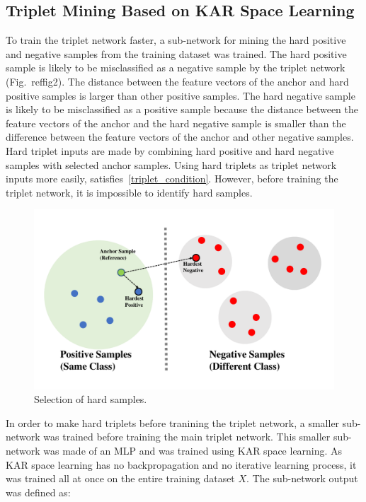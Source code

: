 \subsection{Triplet Mining Based on KAR Space Learning}
To train the triplet network faster, a sub-network for mining the hard positive and negative samples from the training dataset was trained.
The hard positive sample is likely to be misclassified as a negative sample by the triplet network (Fig.~ref{fig2}).
The distance between the feature vectors of the anchor and hard positive samples is larger than other positive samples.
The hard negative sample is likely to be misclassified as a positive sample because the distance between the feature vectors of the anchor and the hard negative sample is smaller than the difference between the feature vectors of the anchor and other negative samples.
Hard triplet inputs are made by combining hard positive and hard negative samples with selected anchor samples. Using hard triplets as triplet network inputs more easily, satisfies~\ref{triplet_condition}. However, before training the triplet network, it is impossible to identify hard samples.
\begin{figure}[!ht]
    \includegraphics[width=\textwidth]
        {fig_hardsample_v1.pdf}
    \caption{Selection of hard samples.} \label{fig2}
\end{figure}
In order to make hard triplets before tranining the triplet network, a smaller sub-network was trained before training the main triplet network.
This smaller sub-network was made of an MLP and was trained using KAR space learning. As KAR space learning has no backpropagation and no iterative learning process, it was trained all at once on the entire training dataset $X$. 
The sub-network output was defined as: 

